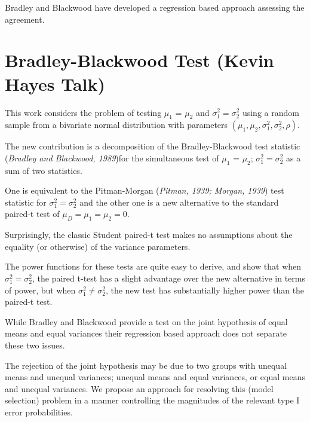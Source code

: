 \documentclass[]{article}
\begin{document}
Bradley and Blackwood have developed a regression based approach
assessing the agreement.




\newpage
\section{Bradley-Blackwood Test (Kevin Hayes Talk)}

This work considers the problem of testing $\mu_1$ = $\mu_2$ and $\sigma^2_1 = \sigma^2_2$ using a random sample from a bivariate normal distribution with parameters $(\mu_1, \mu_2, \sigma^2_1, \sigma^2_2, \rho)$. 

The new contribution is a decomposition of the Bradley-Blackwood test statistic (\textit{Bradley and Blackwood, 1989})for the simultaneous test of {$\mu_1$ = $\mu_2$; $\sigma^2_1 = \sigma^2_2$}  as a sum of two statistics. 

One is equivalent to the Pitman-Morgan (\textit{Pitman, 1939; Morgan, 1939}) test statistic 
for $\sigma^2_1 = \sigma^2_2$ and the other one is a new alternative to the standard paired-t test of $\mu_D = \mu_1 = \mu_2 = 0$. 

Surprisingly, the classic Student paired-t test makes no assumptions about the equality (or otherwise) of the 
variance parameters. 

The power functions for these tests are quite easy to derive, and show that when $\sigma^2_1 = \sigma^2_2$, 
the paired t-test has a slight advantage over the new alternative in terms of power, but when $\sigma^2_1 \neq \sigma^2_2$, the 
new test has substantially higher power than the paired-t test.

While Bradley and Blackwood provide a test on the joint hypothesis of equal means and equal variances their regression based approach does not separate these two issues.

The rejection of the joint hypothesis may be 
due to two groups with unequal means and unequal variances; unequal means and equal variances, or equal means and unequal variances. We propose an approach for resolving this (model selection) problem in a manner controlling the magnitudes of the relevant type I error probabilities.
\end{document}

